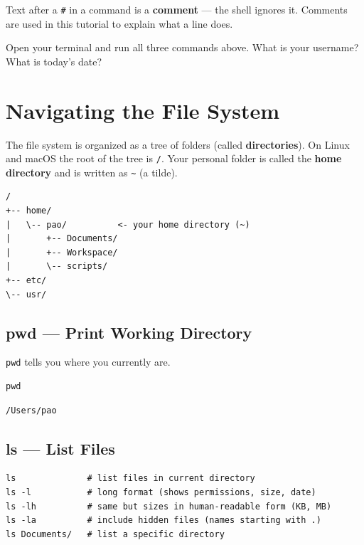 \documentclass[12pt,a4paper]{article}
\newcommand{\tip}[1]{%
  \begin{tcolorbox}[tipstyle]
    #1
  \end{tcolorbox}
}
\newcommand{\exercise}[1]{%
  \begin{tcolorbox}[exercisestyle]
    #1
  \end{tcolorbox}
}
\newcommand{\cmd}[1]{\texttt{\textcolor{kugreen!70!black}{#1}}}
\begin{document}
\tip{
  Text after a \texttt{\#} in a command is a \textbf{comment} --- the shell
  ignores it. Comments are used in this tutorial to explain what a line does.
}

\exercise{
  Open your terminal and run all three commands above. What is your username?
  What is today's date?
}

\section{Navigating the File System}

The file system is organized as a tree of folders (called \textbf{directories}).
On Linux and macOS the root of the tree is \texttt{/}. Your personal folder is
called the \textbf{home directory} and is written as \texttt{\textasciitilde}
(a tilde).

\begin{lstlisting}[style=bash]
/
+-- home/
|   \-- pao/          <- your home directory (~)
|       +-- Documents/
|       +-- Workspace/
|       \-- scripts/
+-- etc/
\-- usr/
\end{lstlisting}

\subsection{pwd --- Print Working Directory}

\cmd{pwd} tells you where you currently are.

\begin{lstlisting}[style=bash]
pwd
\end{lstlisting}
\begin{lstlisting}[style=terminal]
/Users/pao
\end{lstlisting}

\subsection{ls --- List Files}

\begin{lstlisting}[style=bash]
ls              # list files in current directory
ls -l           # long format (shows permissions, size, date)
ls -lh          # same but sizes in human-readable form (KB, MB)
ls -la          # include hidden files (names starting with .)
ls Documents/   # list a specific directory
\end{lstlisting}
\end{document}
